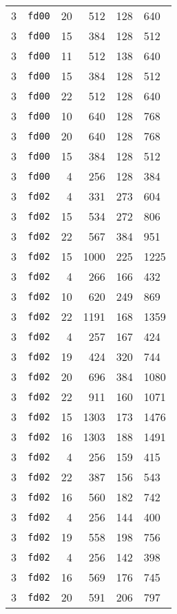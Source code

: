 \documentclass{article}
\begin{document}
\begin{table}[h!]
\begin{tabular}{llrrrl}
    3 & \texttt{fd00} & 20 & 512 & 128 & 640 \\
    3 & \texttt{fd00} & 15 & 384 & 128 & 512 \\
    3 & \texttt{fd00} & 11 & 512 & 138 & 640 \\
    3 & \texttt{fd00} & 15 & 384 & 128 & 512 \\
    3 & \texttt{fd00} & 22 & 512 & 128 & 640 \\
    3 & \texttt{fd00} & 10 & 640 & 128 & 768 \\
    3 & \texttt{fd00} & 20 & 640 & 128 & 768 \\
    3 & \texttt{fd00} & 15 & 384 & 128 & 512 \\
    3 & \texttt{fd00} & 4 & 256 & 128 & 384 \\
    3 & \texttt{fd02} & 4 & 331 & 273 & 604 \\
    3 & \texttt{fd02} & 15 & 534 & 272 & 806 \\
    3 & \texttt{fd02} & 22 & 567 & 384 & 951 \\
    3 & \texttt{fd02} & 15 & 1000 & 225 & 1225 \\
    3 & \texttt{fd02} & 4 & 266 & 166 & 432 \\
    3 & \texttt{fd02} & 10 & 620 & 249 & 869 \\
    3 & \texttt{fd02} & 22 & 1191 & 168 & 1359 \\
    3 & \texttt{fd02} & 4 & 257 & 167 & 424 \\
    3 & \texttt{fd02} & 19 & 424 & 320 & 744 \\
    3 & \texttt{fd02} & 20 & 696 & 384 & 1080 \\
    3 & \texttt{fd02} & 22 & 911 & 160 & 1071 \\
    3 & \texttt{fd02} & 15 & 1303 & 173 & 1476 \\
    3 & \texttt{fd02} & 16 & 1303 & 188 & 1491 \\
    3 & \texttt{fd02} & 4 & 256 & 159 & 415 \\
    3 & \texttt{fd02} & 22 & 387 & 156 & 543 \\
    3 & \texttt{fd02} & 16 & 560 & 182 & 742 \\
    3 & \texttt{fd02} & 4 & 256 & 144 & 400 \\
    3 & \texttt{fd02} & 19 & 558 & 198 & 756 \\
    3 & \texttt{fd02} & 4 & 256 & 142 & 398 \\
    3 & \texttt{fd02} & 16 & 569 & 176 & 745 \\
    3 & \texttt{fd02} & 20 & 591 & 206 & 797 \\

\end{tabular}
\end{table}
\end{document}
